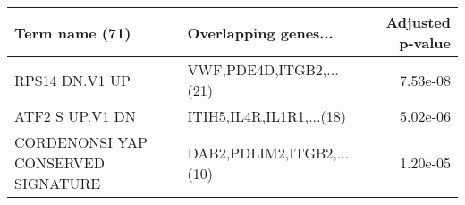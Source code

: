 \begin{tabular}{llr}
\toprule
                    Term name (71) &      Overlapping genes... &  Adjusted p-value \\
\midrule
                    RPS14 DN.V1 UP &   VWF,PDE4D,ITGB2,...(21) &          7.53e-08 \\
                   ATF2 S UP.V1 DN &  ITIH5,IL4R,IL1R1,...(18) &          5.02e-06 \\
CORDENONSI YAP CONSERVED SIGNATURE & DAB2,PDLIM2,ITGB2,...(10) &          1.20e-05 \\
\bottomrule
\end{tabular}
